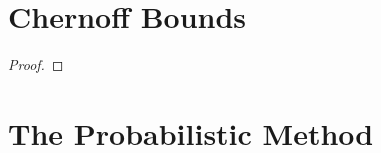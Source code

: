     \section{Chernoff Bounds}
        \begin{theorem}
        \end{theorem}
        \begin{proof}
        \end{proof}
    \section{The Probabilistic Method}

